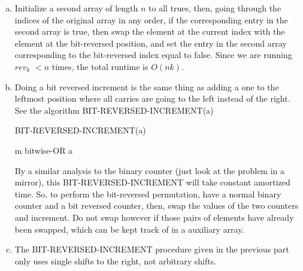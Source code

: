 \documentclass{article}
\begin{document}
\begin{enumerate}[a.]
\item
Initialize a second array of length $n$ to all trues, then, going through the indices of the original array in any order, if  the corresponding entry in the second array is true, then swap the element at the current index with the element at the bit-reversed position, and set the entry in the second array corresponding to the bit-reversed index equal to false. Since we are running $rev_k$ $< n$ times, the total runtime is $O(nk)$.
\item
Doing a bit reversed increment is the same thing as adding a one to the leftmost position where all carries are going to the left instead of the right. See the algorithm BIT-REVERSED-INCREMENT(a)

\begin{algorithm}
\caption{BIT-REVERSED-INCREMENT(a)}
\begin{algorithmic}
\EndWhile
\Return m bitwise-OR a
\end{algorithmic}
\end{algorithm}

By a similar analysis to the binary counter (just look at the problem in a mirror), this BIT-REVERSED-INCREMENT will take constant amortized time. So, to perform the bit-reversed permutation, have a normal binary counter and a bit reversed counter, then, swap the values of the two counters and increment. Do not swap however if those pairs of elements have already been swapped, which can be kept track of in a auxiliary array.

\item The BIT-REVERSED-INCREMENT procedure given in the previous part only uses single shifts to the right, not arbitrary shifts.

\end{enumerate}
\end{document}
